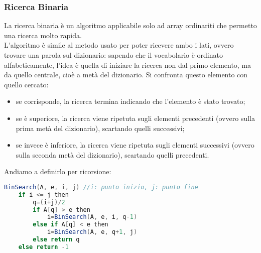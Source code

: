 \subsubsection{Ricerca Binaria}
La ricerca binaria è un algoritmo applicabile solo ad array ordinariti che permetto una ricerca molto rapida.\\
 L'algoritmo è simile al metodo usato per poter ricevere ambo i lati, ovvero trovare una parola sul dizionario: sapendo che il vocabolario è ordinato alfabeticamente, l'idea è quella di iniziare la ricerca non dal primo elemento, ma da quello centrale, cioè a metà del dizionario. Si confronta questo elemento con quello cercato:
\begin{itemize}
\item se corrisponde, la ricerca termina indicando che l'elemento è stato trovato;
    \item se è superiore, la ricerca viene ripetuta sugli elementi precedenti (ovvero sulla prima metà del dizionario), scartando quelli successivi;
    \item se invece è inferiore, la ricerca viene ripetuta sugli elementi successivi (ovvero sulla seconda metà del dizionario), scartando quelli precedenti.
\end{itemize}
Andiamo a definirlo per ricorsione:
\begin{lstlisting}[language=Java]
BinSearch(A, e, i, j) //i: punto inizio, j: punto fine
	if i <= j then
		q=(i+j)/2
		if A[q] > e then
			i=BinSearch(A, e, i, q-1)
		else if A[q] < e then
			i=BinSearch(A, e, q+1, j)
		else return q
	else return -1
\end{lstlisting}